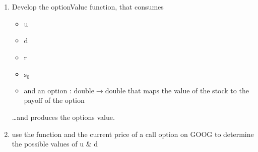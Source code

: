 \documentclass{article}
\begin{document}
\begin{enumerate}
\item Develop the optionValue function, that consumes
   \begin{itemize}
   \item u 
   \item d
   \item r 
   \item $\mathrm{s}_\mathrm{0}$
   \item and an option : $ \mathrm{double} \rightarrow \mathrm{double}$ 
         that maps the value of the stock to the payoff of the option

   \end{itemize}
   \ldots and produces the options value.

\item use the function and the current price of a call option on 
      GOOG to determine the possible values of u \& d

\end{enumerate}
\end{document}
